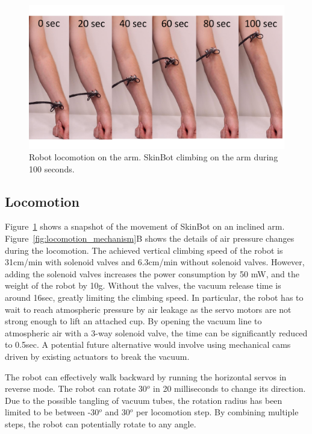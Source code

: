 \begin{figure}[!b]
\centering
\includegraphics[width=12.0cm]{pictures/chapter3/snapshot_locomotion.pdf}
\caption{Robot locomotion on the arm. SkinBot climbing on the arm during 100 seconds.}
\label{fig:locomotion_snapshot}
\end{figure}

\subsection{Locomotion}
Figure~\ref{fig:locomotion_snapshot} shows a snapshot of the movement of SkinBot on an inclined arm. Figure~\ref{fig:locomotion_mechanism}B shows the details of air pressure changes during the locomotion. The achieved vertical climbing speed of the robot is 31cm/min with solenoid valves and 6.3cm/min without solenoid valves. However, adding the solenoid valves increases the power consumption by 50 mW, and the weight of the robot by 10g. Without the valves, the vacuum release time is around 16sec, greatly limiting the climbing speed. In particular, the robot has to wait to reach atmospheric pressure by air leakage as the servo motors are not strong enough to lift an attached cup. By opening the vacuum line to atmospheric air with a 3-way solenoid valve, the time can be significantly reduced to 0.5sec. A potential future alternative would involve using mechanical cams driven by existing actuators to break the vacuum. 

The robot can effectively walk backward by running the horizontal servos in reverse mode. The robot can rotate 30$^o$ in 20 milliseconds to change its direction. Due to the possible tangling of vacuum tubes, the rotation radius has been limited to be between -30$^o$ and 30$^o$ per locomotion step. By combining multiple steps, the robot can potentially rotate to any angle.  



